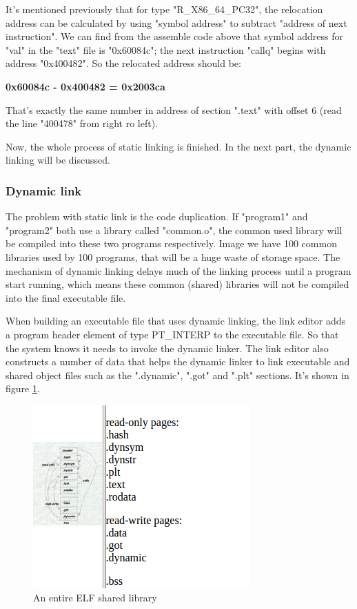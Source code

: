      It's mentioned previously that for type "R\_X86\_64\_PC32", the relocation address can be calculated by using "symbol address" to subtract "address of next instruction". We can find from the assemble code above that symbol address for "val" in the "text" file is "0x60084c"; the next instruction "callq" begins with address "0x400482". So the relocated address should be:    
     
     \textbf{0x60084c - 0x400482 = 0x2003ca}
     
     That's exactly the same number in address of section ".text" with offset 6 (read the line "400478" from right ro left).
     
     
     Now, the whole process of static linking is finished. In the next part, the dynamic linking will be discussed.  
     
        
    \subsubsection{Dynamic link}
    The problem with static link is the code duplication. If "program1" and "program2" both use a library called "common.o", the common used library will be compiled into these two programs respectively. Image we have 100 common libraries used by 100 programs, that will be a huge waste of storage space. The mechanism of dynamic linking delays much of the linking process until a program start running\cite{LAL-00}, which means these common (shared) libraries will not be compiled into the final executable file. 
    
    When building an executable file that uses dynamic linking, the link editor adds a program header element of type PT\_INTERP to the executable file\cite{TIS-95}. So that the system knows it needs to invoke the dynamic linker\cite{TIS-95}. The link editor also constructs a number of data that helps the dynamic linker to link executable and shared object files\cite{TIS-95} such as the ".dynamic", ".got" and ".plt" sections. It's shown in figure \ref{fig:ELFsharedlibrary}.
    
            \begin{figure}
                \centering
                \includegraphics[scale = 0.6]
                {Images/concepts/ELFsharedlibrary.png}
                \caption[An entire ELF shared library]%
                {An entire ELF shared library\footnotemark}    
                \label{fig:ELFsharedlibrary}
            \end{figure}
            
